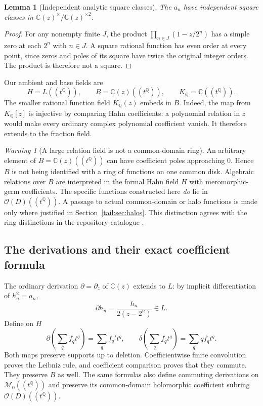 \documentclass[11pt,a4paper]{article}
\numberwithin{equation}{section}
\newtheorem{lemma}[theorem]{Lemma}
\theoremstyle{definition}
\theoremstyle{remark}
\newtheorem{warning}[theorem]{Warning}
\newcommand{\C}{\mathbb C}
\newcommand{\Q}{\mathbb Q}
\newcommand{\OO}{\mathcal O}
\newcommand{\EDer}{\delta}
\begin{document}
\begin{lemma}[Independent analytic square classes]\label{tail:lem:analyticclasses}
The $a_n$ have independent square classes in $\C(z)^\times/\C(z)^{\times2}$.
\end{lemma}
\begin{proof}
For any nonempty finite $J$, the product $\prod_{n\in J}(1-z/2^n)$ has
a simple zero at each $2^n$ with $n\in J$. A square rational function has
even order at every point, since zeros and poles of its square have twice
the original integer orders. The product is therefore not a square.
\end{proof}

Our ambient and base fields are
\begin{equation}\label{tail:eq:analyticfields}
 H=L((t^\Q)),\qquad B=\C(z)((t^\Q)),\qquad K_\Q=\C((t^\Q)).
\end{equation}
The smaller rational function field $K_\Q(z)$ embeds in $B$. Indeed,
the map from $K_\Q[z]$ is injective by comparing Hahn coefficients:
a polynomial relation in $z$ would make every ordinary complex polynomial
coefficient vanish. It therefore extends to the fraction field.

\begin{warning}[A large relation field is not a common-domain ring]
An arbitrary element of $B=\C(z)((t^\Q))$ can have coefficient poles
approaching $0$. Hence $B$ is not being identified with a ring of
functions on one common disk. Algebraic relations over $B$ are interpreted
in the formal Hahn field $H$ with meromorphic-germ coefficients. The
specific functions constructed here \emph{do} lie in
$\OO(D)((t^\Q))$. A passage to actual common-domain or halo functions is
made only where justified in Section~\ref{tail:sec:halos}. This distinction
agrees with the ring distinctions in the repository catalogue
\cite{RepoMap}.
\end{warning}

\subsection{The derivations and their exact coefficient formula}
The ordinary derivation $\partial=\partial_z$ of $\C(z)$ extends to $L$:
by implicit differentiation of $h_n^2=a_n$,
\[
 \partial h_n=\frac{h_n}{2(z-2^n)}\in L.
\]
Define on $H$
\begin{equation}\label{tail:eq:twoderivations}
 \partial\left(\sum_q f_qt^q\right)=\sum_q f_q't^q,
 \qquad
 \EDer\left(\sum_q f_qt^q\right)=\sum_q qf_qt^q.
\end{equation}
Both maps preserve supports up to deletion. Coefficientwise finite
convolution proves the Leibniz rule, and coefficient comparison proves
that they commute. They preserve $B$ as well. The same formulas also define commuting derivations on
$\mathscr M_0((t^\Q))$ and preserve its common-domain holomorphic
coefficient subring $\OO(D)((t^\Q))$.
\end{document}
